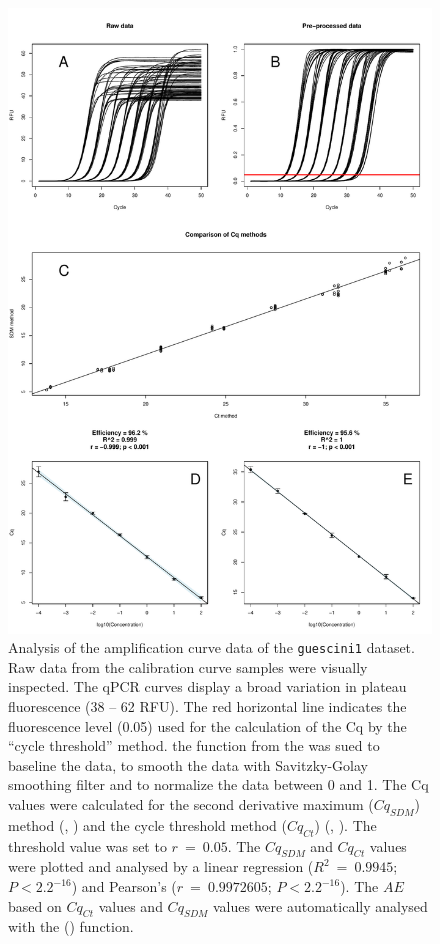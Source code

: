 \begin{figure}[htbp]
  \centering
  \includegraphics[clip=true, width=14cm]{figures/dilution_Cq.pdf}
  \caption{Analysis of the amplification curve data of the \texttt{guescini1} 
dataset.  Raw data from the calibration curve samples were visually 
inspected. The qPCR curves display a broad variation in plateau fluorescence (38 
-- 62 RFU). The red horizontal line indicates the fluorescence level (0.05) used 
for the calculation of the Cq by the ``cycle threshold'' method.  
the  function from the  was sued to baseline the 
data, to smooth the data with Savitzky-Golay smoothing filter and to normalize 
the data between 0 and 1.  The Cq values were calculated for the 
second derivative maximum ($Cq_{SDM}$) method (, ) 
and the cycle threshold method ($Cq_{Ct}$) (, ). 
The threshold value was set to $r~=~0.05$. The $Cq_{SDM}$ and $Cq_{Ct}$ values 
were plotted and analysed by a linear regression ($R^{2}~=~0.9945$; $P < 
2.2^{-16}$) and Pearson's ($r~=~0.9972605$; $P < 2.2^{-16}$). The $AE$ based on 
 $Cq_{Ct}$ values and  $Cq_{SDM}$ values were 
automatically analysed with the  () function.}
  \label{figure:dilution_Cq}
\end{figure}

